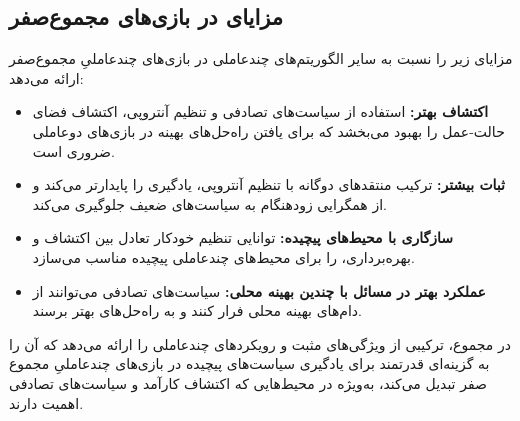 \subsection{مزایای  در بازی‌های مجموع­‌صفر}

 مزایای زیر را نسبت به سایر الگوریتم‌های چند­عاملی در بازی‌های چندعاملیِ مجموع­‌صفر ارائه می‌دهد:

\begin{itemize}
    \item \textbf{اکتشاف بهتر:} استفاده از سیاست‌های تصادفی و تنظیم آنتروپی، اکتشاف فضای حالت-عمل را بهبود می‌بخشد که برای یافتن راه‌حل‌های بهینه در بازی‌های دو­عاملی ضروری است.
    \item \textbf{ثبات بیشتر:} ترکیب منتقدهای دوگانه با تنظیم آنتروپی، یادگیری را پایدارتر می‌کند و از همگرایی زودهنگام به سیاست‌های ضعیف جلوگیری می‌کند.
    \item \textbf{سازگاری با محیط‌های پیچیده:} توانایی تنظیم خودکار تعادل بین اکتشاف و بهره‌برداری،  را برای محیط‌های چند­عاملی پیچیده مناسب می‌سازد.
    \item \textbf{عملکرد بهتر در مسائل با چندین بهینه محلی:} سیاست‌های تصادفی می‌توانند از دام‌های بهینه محلی فرار کنند و به راه‌حل‌های بهتر برسند.
\end{itemize}

در مجموع،  ترکیبی از ویژگی‌های مثبت  و رویکردهای چند­عاملی را ارائه می‌دهد که آن را به گزینه‌ای قدرتمند برای یادگیری سیاست‌های پیچیده در بازی‌های چندعاملیِ مجموع­‌صفر تبدیل می‌کند، به‌ویژه در محیط‌هایی که اکتشاف کارآمد و سیاست‌های تصادفی اهمیت دارند.
